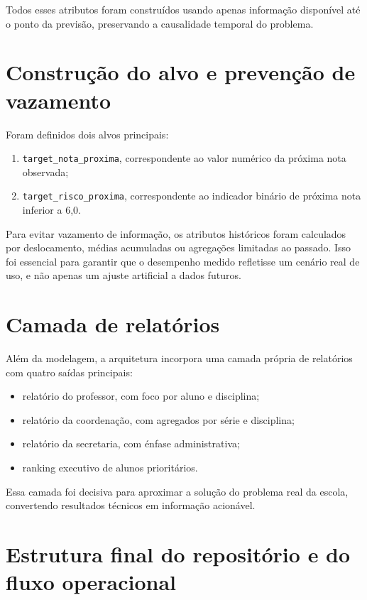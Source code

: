 Todos esses atributos foram constru\'idos usando apenas informa\c{c}\~ao dispon\'ivel at\'e o ponto da previs\~ao, preservando a causalidade temporal do problema.

\section{Constru\c{c}\~ao do alvo e preven\c{c}\~ao de vazamento}
\label{sec:alvo}

Foram definidos dois alvos principais:

\begin{enumerate}
    \item \texttt{target\_nota\_proxima}, correspondente ao valor num\'erico da pr\'oxima nota observada;
    \item \texttt{target\_risco\_proxima}, correspondente ao indicador bin\'ario de pr\'oxima nota inferior a 6,0.
\end{enumerate}

Para evitar vazamento de informa\c{c}\~ao, os atributos hist\'oricos foram calculados por deslocamento, m\'edias acumuladas ou agrega\c{c}\~oes limitadas ao passado. Isso foi essencial para garantir que o desempenho medido refletisse um cen\'ario real de uso, e n\~ao apenas um ajuste artificial a dados futuros.

\section{Camada de relat\'orios}
\label{sec:camada-relatorios}

Al\'em da modelagem, a arquitetura incorpora uma camada pr\'opria de relat\'orios com quatro sa\'idas principais:

\begin{itemize}
    \item relat\'orio do professor, com foco por aluno e disciplina;
    \item relat\'orio da coordena\c{c}\~ao, com agregados por s\'erie e disciplina;
    \item relat\'orio da secretaria, com \'enfase administrativa;
    \item ranking executivo de alunos priorit\'arios.
\end{itemize}

Essa camada foi decisiva para aproximar a solu\c{c}\~ao do problema real da escola, convertendo resultados t\'ecnicos em informa\c{c}\~ao acion\'avel.

\section{Estrutura final do reposit\'orio e do fluxo operacional}
\label{sec:estrutura-final}

